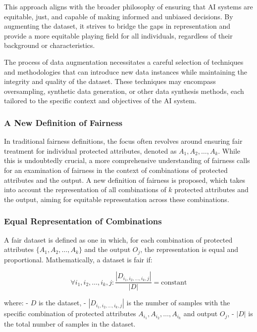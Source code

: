 This approach aligns with the broader philosophy of ensuring that AI systems are equitable, just, and capable of making informed and unbiased decisions. By augmenting the dataset, it strives to bridge the gaps in representation and provide a more equitable playing field for all individuals, regardless of their background or characteristics. 

The process of data augmentation necessitates a careful selection of techniques and methodologies that can introduce new data instances while maintaining the integrity and quality of the dataset. These techniques may encompass oversampling, synthetic data generation, or other data synthesis methods, each tailored to the specific context and objectives of the AI system.

\subsubsection{A New Definition of Fairness}

In traditional fairness definitions, the focus often revolves around ensuring fair treatment for individual protected attributes, denoted as $A_1, A_2, \ldots, A_k$. While this is undoubtedly crucial, a more comprehensive understanding of fairness calls for an examination of fairness in the context of combinations of protected attributes and the output. A new definition of fairness is proposed, which takes into account the representation of all combinations of $k$ protected attributes and the output, aiming for equitable representation across these combinations.

\subsubsection{Equal Representation of Combinations}

A fair dataset is defined as one in which, for each combination of protected attributes $\{A_1, A_2, \ldots, A_k\}$ and the output $O_j$, the representation is equal and proportional. Mathematically, a dataset is fair if:

\[
\forall i_1, i_2, \ldots, i_k, j: \frac{|D_{i_1, i_2, \ldots, i_k, j}|}{|D|} = \text{constant}
\]

where:
- $D$ is the dataset,
- $|D_{i_1, i_2, \ldots, i_k, j}|$ is the number of samples with the specific combination of protected attributes $A_{i_1}, A_{i_2}, \ldots, A_{i_k}$ and output $O_j$,
- $|D|$ is the total number of samples in the dataset.

